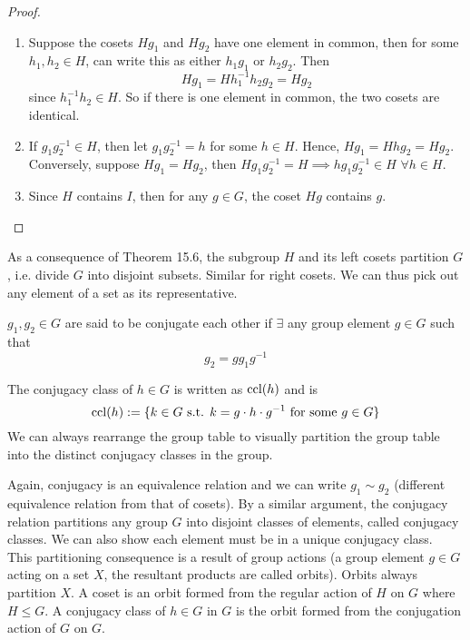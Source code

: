 \documentclass[a4paper]{article}
\begin{document}
\begin{proof}\leavevmode
\begin{enumerate}
    \item Suppose the cosets $Hg_1$ and $Hg_2$ have one element in common, then for some $h_1,h_2\in H$, can write this as either $h_1g_1$ or $h_2g_2$. Then
    $$Hg_1=Hh_1^{-1}h_2g_2=Hg_2$$
    since $h_1^{-1}h_2\in H$. So if there is one element in common, the two cosets are identical.
    \item If $g_1g_2^{-1}\in H$, then let $g_1g_2^{-1}=h$ for some $h\in H$. Hence, $Hg_1=Hhg_2=Hg_2$. Conversely, suppose $Hg_1=Hg_2$, then $Hg_1g_2^{-1}=H\implies hg_1g_2^{-1}\in H$ $\forall h\in H$.
    \item Since $H$ contains $I$, then for any $g\in G$, the coset $Hg$ contains $g$.
\end{enumerate}
\end{proof}
\begin{remarks}
As a consequence of Theorem 15.6, the subgroup $H$ and its left cosets partition $G$, i.e. divide $G$ into disjoint subsets. Similar for right cosets. We can thus pick out any element of a set as its representative.
\end{remarks}
\begin{defi}[Conjugation]
$g_1,g_2\in G$ are said to be conjugate each other if $\exists$ any group element $g\in G$ such that
$$g_2=gg_1g^{-1}$$
\end{defi}
\begin{defi}
The conjugacy class of $h\in G$ is written as $\operatorname{ccl}(h)$ and is
$$\operatorname{ccl}(h):=\{k\in G\text{ s.t. }k=g\cdot h\cdot g^{-1}\text{ for some }g\in G\}$$
We can always rearrange the group table to visually partition the group table into the distinct conjugacy classes in the group.
\end{defi}
\begin{remarks}
Again, conjugacy is an equivalence relation and we can write $g_1\sim g_2$ (different equivalence relation from that of cosets). By a similar argument, the conjugacy relation partitions any group $G$ into disjoint classes of elements, called conjugacy classes. We can also show each element must be in a unique conjugacy class.\\[5pt]
This partitioning consequence is a result of group actions (a group element $g\in G$ acting on a set $X$, the resultant products are called orbits). Orbits always partition $X$. A coset is an orbit formed from the regular action of $H$ on $G$ where $H\leq G$. A conjugacy class of $h\in G$ in $G$ is the orbit formed from the conjugation action of $G$ on $G$.
\end{remarks}
\end{document}
